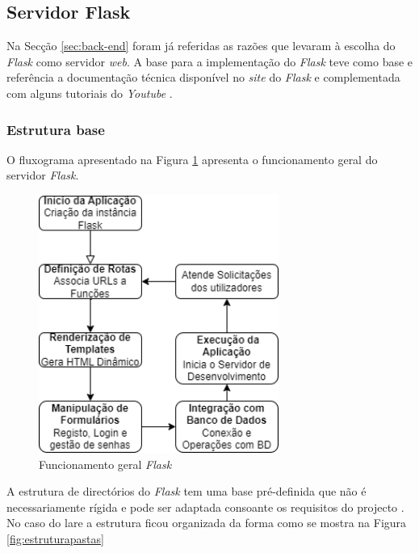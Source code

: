 \subsection{Servidor Flask}
\label{sec:flask}
Na Secção \ref{sec:back-end} foram já referidas as razões que levaram à escolha do \textit{Flask} como servidor \textit{web}. A base para a implementação do \textit{Flask} teve como base e referência a documentação técnica disponível no \textit{site} do \textit{Flask} \cite{Flask} e complementada com alguns tutoriais do \textit{Youtube} \cite{tutorialsiteflask, flaskDigitalOcean}.

\subsubsection{Estrutura base}
O fluxograma apresentado na Figura \ref{fig:funcflask} apresenta o funcionamento geral do servidor \textit{Flask}.

\begin{figure}[hbtp]
	\centering
	\includegraphics[width=0.7\textwidth]{figures/fluxograma_flask.drawio.png}
	\caption{Funcionamento geral \textit{Flask}}
	\label{fig:funcflask}
\end{figure}

A estrutura de directórios do \textit{Flask} tem uma base pré-definida que não é necessariamente rígida e pode ser adaptada consoante os requisitos do projecto \cite{Flask}. No caso do \acrshort{lare} a estrutura ficou organizada da forma como se mostra na Figura \ref{fig:estruturapastas}

